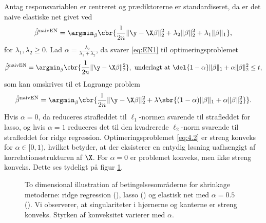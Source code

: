 Antag responsvariablen er centreret og prædiktorerne er standardiseret, da er det naive elastiske net givet ved
\begin{align}
\hat{\beta}^\text{naivEN} = \argmin_{\beta} \cbr{ \frac{1}{2n} \Vert \y - \X \beta \Vert_2^2 + \lambda_2 \Vert \beta \Vert_2^2 + \lambda_1 \Vert \beta \Vert_1}, \label{eq:EN1}
\end{align}
for \(\lambda_1, \lambda_2 \geq 0\).
Lad \(\alpha = \frac{\lambda_2}{\lambda_1 + \lambda_2}\), da svarer \eqref{eq:EN1} til optimeringsproblemet
\begin{align*}
\hat{\beta}^\text{naivEN} = \argmin_{\beta} \cbr{\frac{1}{2n} \Vert \y - \X \beta \Vert_2^2}, \ \text{underlagt at } \del{1-\alpha} \Vert \beta \Vert_1 + \alpha \Vert \beta \Vert_2^2 \leq t,
\end{align*}
som kan omskrives til et Lagrange problem
\begin{align}
\hat{\beta}^\text{naivEN} =\argmin_{\beta} \cbr{\frac{1}{2n} \Vert \y - \X \beta \Vert_2^2 + \lambda \sbr{(1- \alpha) \Vert \beta \Vert_1 + \alpha \Vert \beta \Vert_2^2}}. \label{eq:4.2}
\end{align}
Hvis $\alpha=0$, da reduceres strafleddet til $\ell_1$-normen svarende til strafleddet for lasso, og hvis $\alpha=1$ reduceres det til den kvadrerede $\ell_2$-norm svarende til strafleddet for ridge regression.
Optimeringsproblemet  \eqref{eq:4.2} er streng konveks for \(\alpha \in [0,1)\), hvilket betyder, at der eksisterer en entydig løsning uafhængigt af korrelationsstrukturen af $\X$.
For  \(\alpha=0\) er problemet konveks, men ikke streng konveks.
Dette ses tydeligt på figur \ref{fig:elastisk}.
%
\begin{figure}[H]
\centering
\scalebox{0.8}{}
\caption[optional short text]{To dimensional illustration af betingelsesområderne for shrinkage metoderne: ridge regression (), lasso () og elastisk net med \(\alpha = 0.5\) (). Vi observerer, at singulariteter i hjørnerne og kanterne er streng konveks. Styrken af konveksitet varierer med \(\alpha\).} \label{fig:elastisk}
\end{figure}
%
